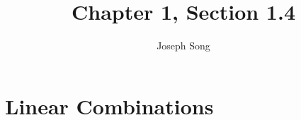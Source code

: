 \documentclass{article}
\title{Chapter 1, Section 1.4}
\author{Joseph Song}
\date{}
\begin{document}
 
 \maketitle

 \section{Linear Combinations}
 
 
\end{document}
